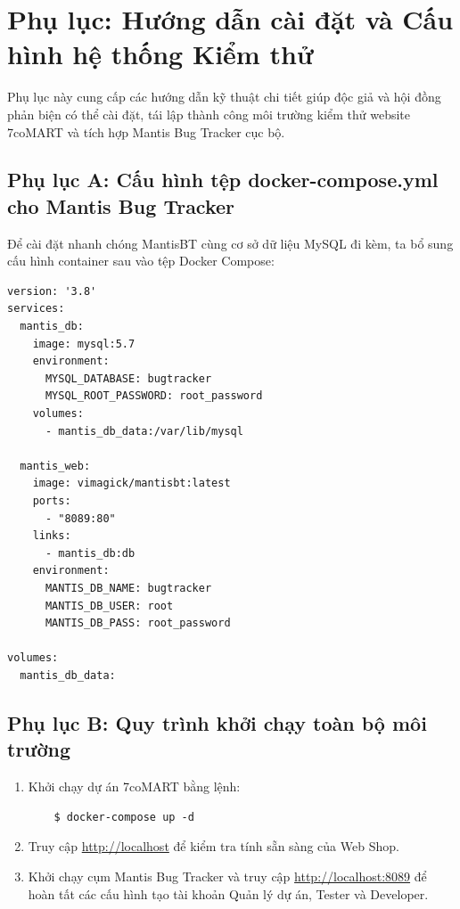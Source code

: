 \appendix
\chapter{Phụ lục: Hướng dẫn cài đặt và Cấu hình hệ thống Kiểm thử}

Phụ lục này cung cấp các hướng dẫn kỹ thuật chi tiết giúp độc giả và hội đồng phản biện có thể cài đặt, tái lập thành công môi trường kiểm thử website 7coMART và tích hợp Mantis Bug Tracker cục bộ.

\section*{Phụ lục A: Cấu hình tệp docker-compose.yml cho Mantis Bug Tracker}
Để cài đặt nhanh chóng MantisBT cùng cơ sở dữ liệu MySQL đi kèm, ta bổ sung cấu hình container sau vào tệp Docker Compose:

\begin{verbatim}
version: '3.8'
services:
  mantis_db:
    image: mysql:5.7
    environment:
      MYSQL_DATABASE: bugtracker
      MYSQL_ROOT_PASSWORD: root_password
    volumes:
      - mantis_db_data:/var/lib/mysql

  mantis_web:
    image: vimagick/mantisbt:latest
    ports:
      - "8089:80"
    links:
      - mantis_db:db
    environment:
      MANTIS_DB_NAME: bugtracker
      MANTIS_DB_USER: root
      MANTIS_DB_PASS: root_password

volumes:
  mantis_db_data:
\end{verbatim}

\section*{Phụ lục B: Quy trình khởi chạy toàn bộ môi trường}
\begin{enumerate}
    \item Khởi chạy dự án 7coMART bằng lệnh:
    \begin{verbatim}
    $ docker-compose up -d
    \end{verbatim}
    \item Truy cập \url{http://localhost} để kiểm tra tính sẵn sàng của Web Shop.
    \item Khởi chạy cụm Mantis Bug Tracker và truy cập \url{http://localhost:8089} để hoàn tất các cấu hình tạo tài khoản Quản lý dự án, Tester và Developer.
\end{enumerate}
